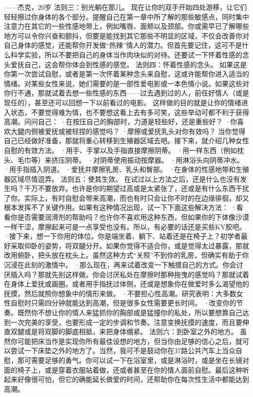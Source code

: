 \documentclass[12pt,UTF8]{ctexbook}
\begin{document}
——杰克，20岁
法则三：别光躺在那儿。
现在让你的双手开始四处游移，让它们轻轻擦过你身体的各个部分。提醒自己在第一章中所了解的那些敏感点，同时集中注意力在其它的一些性感地带上，例如嘴唇、面颊以及颈部。你或需早已了解哪些地方可以令你兴奋和颤抖，但要是能找到其它那些不明显的区域，不仅会改善你对自己身体的感觉，还能帮你开发做“热辣”情人的潜力。但首先要记住，这可不是什么科学实验，所以不要把自己的身体当作肉块似的对待。还要试一下怀着性感的念头爱抚自己，这会帮你体会到性感的感觉。
法则四：怀着性感的念头。
如果这是你第一次尝试自慰，或者是第一次怀着某种念头来自慰，这或许能帮你进入适当的情绪。对某些女性来说，她们需要的是一部性爱电影或一本色情小说。如果这些对你行不通，那就试着去想一些性感的东西——过去遇到过的人，前任好情人（或是现任的），甚至还可以回想一下以前看过的电影。
这样做的目的就是让你的情绪进入状态，不要觉得难为情，也不要想这看上去有多可笑，这些举动可都不利于获得高潮。问问自己：
·在按压自己的胸部时，力道是轻些好，还是重些好？
·你喜欢大腿内侧被爱抚或被轻捏的感觉吗？
·摩擦或爱抚乳头对你有效吗？
当你觉得自己已经做好准备，那就将重心转移到生殖器区域去吧。接下来，就介绍几种女性自慰的有效方法。
·用手、手掌以及手指直接摩擦阴蒂。
·用一样东西（例如枕头、毛巾等）来挤压阴蒂。
·对阴蒂使用振动按摩器。
·用淋浴头向阴蒂冲水。
·用手指插入阴道。
·爱抚并摩擦乳房、乳头和臀部。
·在身体的性感地带和生殖器区域尽情逗弄。
法则五：使其生效。
在试过以上方法之后，还是什么也没有发生吗？千万不要放弃。也许是你的期望过高或是太紧张了，还或是有什么东西干扰了你。实际上，有时自慰会带来高潮，而也有时只会让你不时的在边缘徘徊，却又根本发挥不了关键作用。如果有这种情况出现，试一下下面这些解决方法：
·看看你是否需要润滑剂的帮助吗？也许你不喜欢用这种东西，但如果你的下体像沙漠一样干涩，摩擦起来可是一点享受也没有。所以，有必要的话还是买些KY胶吧。
·接下来，想一下你用的体位。你是端坐着、躺下、站着还是在椅子上？初学者最好采取仰卧的姿势，将双腿分开。如果你觉得不适合你，或是觉得太过暴露，那就改用俯卧，把头放在枕头上。虽然这种方式“关照”不到你的乳房，但确实有助于你沉浸在此刻的激情中。
·那么现在，再来试着改变一下触摸自己的方式。你会讨厌插入吗？那就先别这样做。你会讨厌私处在摩擦时那种拖曳的感觉吗？那就试着在身体上爱抚或画圈。或者用手指抚过体侧，还或是想象你在做爱时多么渴望他的抚摸，然后就照你想象中的情形来做。
·不要担心性高潮。研究表明：大多数女性自慰时只需四分钟就能达到高潮，但是很多女性需要更长时间。
·改变你的节奏。既然你不想让你的情人来猛抓你的胸部或是猛撞你的私处，所以要想靠自己达到一次完美的享受，也要形成一定的步调和节奏。注意变换抚摸的速度，而且要伸直双腿或是将双脚的脚底相抵，来把身体绷紧。
法则六：到卧室之外的地方。
虽然你可能把床当作是实现你所有最佳设想的地方，但当你由足够的信心之后，就可以尝试一下床垫之外的地方了。当然，我可不是鼓动你在37路公共汽车上当众自慰，那可需要足够的勇气。你可以试一下在浴室里，或是淋浴时，或是坐在长镜对面的椅子上，或是穿着衣服站着做，还或者甚至在你的情人面前自慰。最后这种听起来好像很可怕，但它的确能延长做爱的时间，还帮助你在每次性生活中都能达到高潮。
\end{document}
